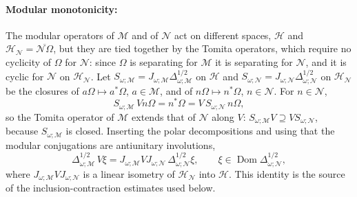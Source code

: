 \documentclass[a4paper,11pt]{article}
\theoremstyle{definition}
\newcommand{\mN}{\mathcal{N}}
\newcommand{\mH}{\mathcal{H}}
\newcommand{\mM}{\mathcal{M}}
\begin{document}
\paragraph{Modular monotonicity:}
The modular operators of $\mM$ and of $\mN$ act on different spaces, $\mathcal H$ and $\mH_{\mN}=\overline{\mN\Omega}$, but they are tied together by the Tomita operators, which require no cyclicity of $\Omega$ for $\mN$: since $\Omega$ is separating for $\mM$ it is separating for $\mN$, and it is cyclic for $\mN$ on $\mH_{\mN}$. Let $S_{\omega;\mM}=J_{\omega;\mM}\Delta_{\omega;\mM}^{1/2}$ on $\mathcal H$ and $S_{\omega;\mN}=J_{\omega;\mN}\Delta_{\omega;\mN}^{1/2}$ on $\mH_{\mN}$ be the closures of $a\Omega\mapsto a^*\Omega$, $a\in\mM$, and of $n\Omega\mapsto n^*\Omega$, $n\in\mN$. For $n\in\mN$,
\begin{equation}
  S_{\omega;\mM}\,Vn\Omega=n^*\Omega=V\,S_{\omega;\mN}\,n\Omega ,
  \label{eq:Tomita-extension}
\end{equation}
so the Tomita operator of $\mM$ extends that of $\mN$ along $V$: $S_{\omega;\mM}V\supseteq VS_{\omega;\mN}$, because $S_{\omega;\mM}$ is closed. Inserting the polar decompositions and using that the modular conjugations are antiunitary involutions,
\begin{equation}
  \Delta_{\omega;\mM}^{1/2}\,V\xi=J_{\omega;\mM}VJ_{\omega;\mN}\,\Delta_{\omega;\mN}^{1/2}\xi ,
  \qquad \xi\in\operatorname{Dom}\Delta_{\omega;\mN}^{1/2},
  \label{eq:modular-extension}
\end{equation}
where $J_{\omega;\mM}VJ_{\omega;\mN}$ is a linear isometry of $\mH_{\mN}$ into $\mathcal H$. This identity is the source of the inclusion-contraction estimates used below.
\end{document}
